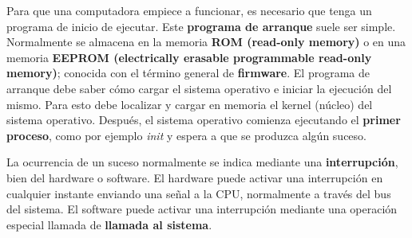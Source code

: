 \documentclass{article}
\begin{document}
Para que una computadora empiece a funcionar, es necesario que tenga un programa de inicio de ejecutar. Este \textbf{programa de arranque}
suele ser simple. Normalmente se almacena en la memoria \textbf{ROM (read-only memory)} o en una memoria 
\textbf{EEPROM (electrically erasable programmable read-only memory)}; conocida con el t\'{e}rmino general de \textbf{firmware}.
El programa de arranque debe saber c\'{o}mo cargar el sistema operativo e iniciar la ejecuci\'{o}n del mismo. Para esto debe localizar
y cargar en memoria el kernel (n\'{u}cleo) del sistema operativo. Despu\'{e}s, el sistema operativo comienza ejecutando el 
\textbf{primer proceso}, como por ejemplo \textit{init} y espera a que se produzca alg\'{u}n suceso.

La ocurrencia de un suceso normalmente se indica mediante una \textbf{interrupci\'{o}n}, bien del hardware o software. El hardware
puede activar una interrupci\'{o}n en cualquier instante enviando una se\~{n}al a la CPU, normalmente a trav\'{e}s del bus del
sistema. El software puede activar una interrupci\'{o}n mediante una operaci\'{o}n especial llamada de \textbf{llamada al sistema}.
\end{document}
